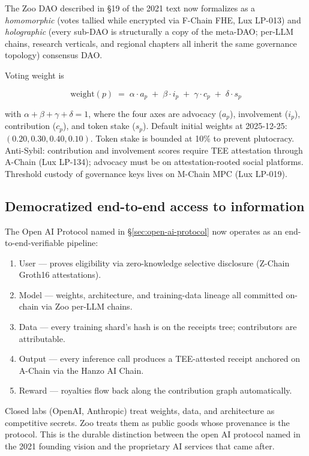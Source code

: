 The Zoo DAO described in §19 of the 2021 text now formalizes as a
\emph{homomorphic} (votes tallied while encrypted via F-Chain FHE,
Lux LP-013) and \emph{holographic} (every sub-DAO is structurally a
copy of the meta-DAO; per-LLM chains, research verticals, and regional
chapters all inherit the same governance topology) consensus DAO.

Voting weight is

\[
\text{weight}(p) \;=\; \alpha \cdot a_p \;+\; \beta \cdot i_p \;+\; \gamma \cdot c_p \;+\; \delta \cdot s_p
\]

\noindent with $\alpha + \beta + \gamma + \delta = 1$, where the four
axes are advocacy ($a_p$), involvement ($i_p$), contribution ($c_p$),
and token stake ($s_p$). Default initial weights at 2025-12-25:
$(0.20, 0.30, 0.40, 0.10)$. Token stake is bounded at 10\% to prevent
plutocracy. Anti-Sybil: contribution and involvement scores require
TEE attestation through A-Chain (Lux LP-134); advocacy must be on
attestation-rooted social platforms. Threshold custody of governance
keys lives on M-Chain MPC (Lux LP-019).

\subsection{Democratized end-to-end access to information}

The Open AI Protocol named in §\ref{sec:open-ai-protocol} now operates
as an end-to-end-verifiable pipeline:

\begin{enumerate}[nosep,leftmargin=1.4em]
\item User --- proves eligibility via zero-knowledge selective
   disclosure (Z-Chain Groth16 attestations).
\item Model --- weights, architecture, and training-data lineage all
   committed on-chain via Zoo per-LLM chains.
\item Data --- every training shard's hash is on the receipts tree;
   contributors are attributable.
\item Output --- every inference call produces a TEE-attested receipt
   anchored on A-Chain via the Hanzo AI Chain.
\item Reward --- royalties flow back along the contribution graph
   automatically.
\end{enumerate}

Closed labs (OpenAI, Anthropic) treat weights, data, and architecture
as competitive secrets. Zoo treats them as public goods whose
provenance is the protocol. This is the durable distinction between
the open AI protocol named in the 2021 founding vision and the
proprietary AI services that came after.


